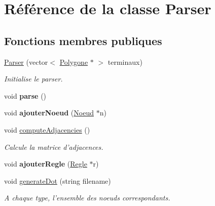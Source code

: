 \hypertarget{class_parser}{\section{Référence de la classe Parser}
\label{class_parser}
}
\subsection*{Fonctions membres publiques}
\begin{DoxyCompactItemize}
\item 
\hyperlink{class_parser_a6f6138bd72ec4a3aa7d76641e122c537}{Parser} (vector$<$ \hyperlink{class_polygone}{Polygone} $\ast$ $>$ terminaux)
\begin{DoxyCompactList}\small\item\em Initialise le parser. \end{DoxyCompactList}\item 
\hypertarget{class_parser_ad941a297e9f6abb39271090806a6be33}{void {\bfseries parse} ()}\label{class_parser_ad941a297e9f6abb39271090806a6be33}

\item 
\hypertarget{class_parser_a7fa7066e4e04f27ae3880fdf645fb693}{void {\bfseries ajouter\-Noeud} (\hyperlink{class_noeud}{Noeud} $\ast$n)}\label{class_parser_a7fa7066e4e04f27ae3880fdf645fb693}

\item 
void \hyperlink{class_parser_ac5704426c8d048ef82b0e7f960529959}{compute\-Adjacencies} ()
\begin{DoxyCompactList}\small\item\em Calcule la matrice d'adjacences. \end{DoxyCompactList}\item 
\hypertarget{class_parser_a87ca20ebcc9c7faa50c74a5958ae68bd}{void {\bfseries ajouter\-Regle} (\hyperlink{class_regle}{Regle} $\ast$r)}\label{class_parser_a87ca20ebcc9c7faa50c74a5958ae68bd}

\item 
void \hyperlink{class_parser_a46eb959ad3811dce52332f74b739206c}{generate\-Dot} (string filename)
\begin{DoxyCompactList}\small\item\em A chaque type, l'ensemble des noeuds correspondants. \end{DoxyCompactList}\end{DoxyCompactItemize}
